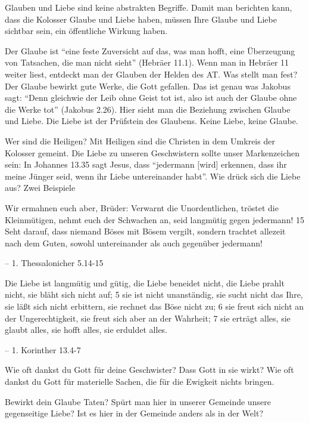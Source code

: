 \documentclass[
  12pt,
]{krantz}
\makeatletter
\newenvironment{kframe}{%
\medskip{}
\setlength{\fboxsep}{.8em}
 \def\at@end@of@kframe{}%
 \ifinner\ifhmode%
  \def\at@end@of@kframe{\end{minipage}}%
  \begin{minipage}{\columnwidth}%
 \fi\fi%
 \def\FrameCommand##1{\hskip\@totalleftmargin \hskip-\fboxsep
 \colorbox{shadecolor}{##1}\hskip-\fboxsep
     \hskip-\linewidth \hskip-\@totalleftmargin \hskip\columnwidth}%
 \MakeFramed {\advance\hsize-\width
   \@totalleftmargin\z@ \linewidth\hsize
   \@setminipage}}%
 {\par\unskip\endMakeFramed%
 \at@end@of@kframe}
\newenvironment{rmdblock}[1]
  {
  \begin{itemize}
  \renewcommand{\labelitemi}{
    \raisebox{-.7\height}[0pt][0pt]{
      {\setkeys{Gin}{width=3em,keepaspectratio}\texttt{[image: img/\#1]}}
    }
  }
  \setlength{\fboxsep}{1em}
  \begin{kframe}
  \item
  }
  {
  \end{kframe}
  \end{itemize}
  }
\newenvironment{rmdquestion}
  {\begin{rmdblock}{question}}
  {\end{rmdblock}}
\newenvironment{rmdquote}
  {\begin{rmdblock}{quote}}
  {\end{rmdblock}}
\makeatother
\begin{document}
Glauben und Liebe sind keine abstrakten Begriffe. Damit man berichten kann, dass die Kolosser Glaube und Liebe haben, müssen Ihre Glaube und Liebe sichtbar sein, ein öffentliche Wirkung haben.

Der Glaube ist ``eine feste Zuversicht auf das, was man hofft, eine Überzeugung von Tatsachen, die man nicht sieht'' (Hebräer 11.1).
Wenn man in Hebräer 11 weiter liest, entdeckt man der Glauben der Helden des AT. Was stellt man fest? Der Glaube bewirkt gute Werke, die Gott gefallen. Das ist genau was Jakobus sagt: ``Denn gleichwie der Leib ohne Geist tot ist, also ist auch der Glaube ohne die Werke tot'' (Jakobus 2.26). Hier sieht man die Beziehung zwischen Glaube und Liebe. Die Liebe ist der Prüfstein des Glaubens. Keine Liebe, keine Glaube.

Wer sind die Heiligen? Mit Heiligen sind die Christen in dem Umkreis der Kolosser gemeint. Die Liebe zu unseren Geschwistern sollte unser Markenzeichen sein: In Johannes 13.35 sagt Jesus, dass ``jedermann {[}wird{]} erkennen, dass ihr meine Jünger seid, wenn ihr Liebe untereinander habt''. Wie drück sich die Liebe aus? Zwei Beispiele

\begin{rmdquote}
Wir ermahnen euch aber, Brüder: Verwarnt die Unordentlichen, tröstet die
Kleinmütigen, nehmt euch der Schwachen an, seid langmütig gegen
jedermann! 15 Seht darauf, dass niemand Böses mit Bösem vergilt, sondern
trachtet allezeit nach dem Guten, sowohl untereinander als auch
gegenüber jedermann!

-- 1. Thessalonicher 5.14-15
\end{rmdquote}

\begin{rmdquote}
Die Liebe ist langmütig und gütig, die Liebe beneidet nicht, die Liebe
prahlt nicht, sie bläht sich nicht auf; 5 sie ist nicht unanständig, sie
sucht nicht das Ihre, sie läßt sich nicht erbittern, sie rechnet das
Böse nicht zu; 6 sie freut sich nicht an der Ungerechtigkeit, sie freut
sich aber an der Wahrheit; 7 sie erträgt alles, sie glaubt alles, sie
hofft alles, sie erduldet alles.

-- 1. Korinther 13.4-7
\end{rmdquote}

\begin{rmdquestion}
Wie oft dankst du Gott für deine Geschwister? Dass Gott in sie wirkt?
Wie oft dankst du Gott für materielle Sachen, die für die Ewigkeit
nichts bringen.

Bewirkt dein Glaube Taten? Spürt man hier in unserer Gemeinde unsere
gegenseitige Liebe? Ist es hier in der Gemeinde anders als in der Welt?
\end{rmdquestion}
\end{document}
